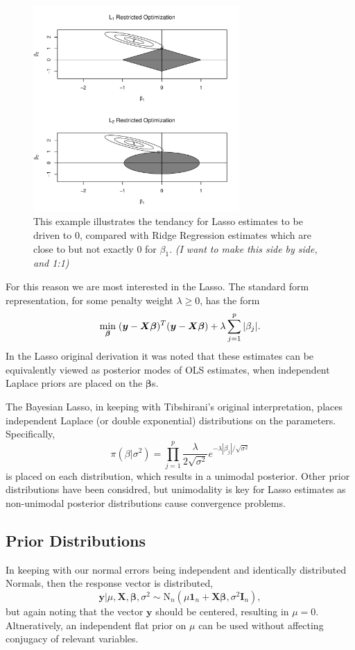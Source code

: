 \documentclass{uwstat572}
\begin{document}
\begin{figure}\label{LassoPlot}
  \centering
    \includegraphics[width=0.7\textwidth]{LassoPlot.pdf}
  \caption{This example illustrates the tendancy for Lasso estimates to be driven to 0, compared with Ridge Regression estimates which are close to but not exactly 0 for $\beta_1$. \emph{\color{red} (I want to make this side by side, and 1:1)\color{black}}}
\end{figure}

For this reason we are most interested in the Lasso. The standard form representation, for some penalty weight $\lambda \geq 0$, has the form \[
\min_{\boldsymbol{\beta}}  \hspace{.1cm} (\boldsymbol{y}-\boldsymbol{X}\boldsymbol{\beta})^T(\boldsymbol{y}-\boldsymbol{X}\boldsymbol{\beta})+\lambda\sum_{j=1}^p|\beta_j|.
\] In the Lasso original derivation it was noted that these estimates can be equivalently viewed as posterior modes of OLS estimates, when independent Laplace priors are placed on the $\boldsymbol{\beta}$s.\cite{tibshirani1996regression}

The Bayesian Lasso, in keeping with Tibshirani's original interpretation, places independent Laplace (or double exponential) distributions on the parameters. Specifically, \[
\pi(\beta|\sigma^2)=\prod_{j=1}^p\frac{\lambda}{2\sqrt{\sigma^2}}e^{-\lambda |\beta_j|/\sqrt{\sigma^2}}
\] is placed on each distribution, which results in a unimodal posterior. Other prior distributions have been considred, but unimodality is key for Lasso estimates as non-unimodal posterior distributions cause convergence problems.

\subsection{Prior Distributions}
In keeping with our normal errors being independent and identically distributed Normals, then the response vector is distributed, \[
\mathbf{y}|\mu,\mathbf{X},\boldsymbol\beta,\sigma^2 \sim \text{N}_n(\mu \mathbf{1}_n+\mathbf{X}\boldsymbol\beta,\sigma^2\mathbf{I}_n), \] but again noting that the vector $\mathbf{y}$ should be centered, resulting in $\mu=0$. Altneratively, an independent flat prior on $\mu$ can be used without affecting conjugacy of relevant variables.
\end{document}
